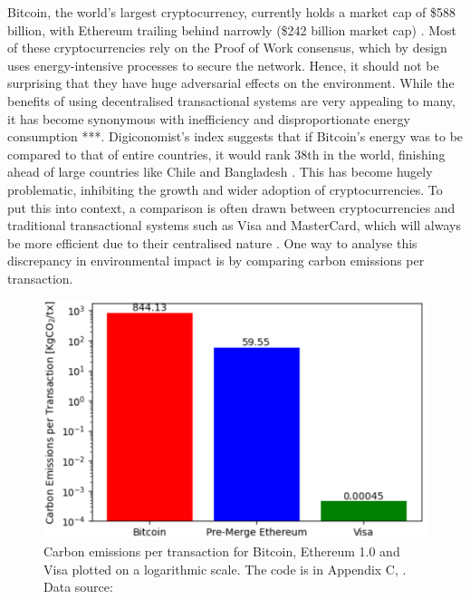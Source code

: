 Bitcoin, the world's largest cryptocurrency, currently holds a market cap of \$588 billion, with Ethereum trailing behind narrowly (\$242 billion market cap) \cite{BitcoinCoinMarketCap}. Most of these cryptocurrencies rely on the Proof of Work consensus, which by design uses energy-intensive processes to secure the network. Hence, it should not be surprising that they have huge adversarial effects on the environment. While the benefits of using decentralised transactional systems are very appealing to many, it has become synonymous with inefficiency and disproportionate energy consumption ***\cite{De Vries 2018}. Digiconomist's index suggests that if Bitcoin's energy was to be compared to that of entire countries, it would rank 38th in the world, finishing ahead of large countries like Chile and Bangladesh \cite{BitcoinDigiconomist}. This has become hugely problematic, inhibiting the growth and wider adoption of cryptocurrencies. To put this into context, a comparison is often drawn between cryptocurrencies and traditional transactional systems such as Visa and MasterCard, which will always be more efficient due to their centralised nature \cite{Kohli2023AnSolutions}. One way to analyse this discrepancy in environmental impact is by comparing carbon emissions per transaction. 

\begin{figure}[h]
    \centering
    \includegraphics[width=13cm,center]{Figures/CarbonEmissionsPlot.png}
    \caption{Carbon emissions per transaction for Bitcoin, Ethereum 1.0 and Visa plotted on a logarithmic scale. The code is in Appendix C, . Data source: \cite{Kohli2023AnSolutions} }
    \label{Figure:CarbonEmissionsPlot}
\end{figure}

